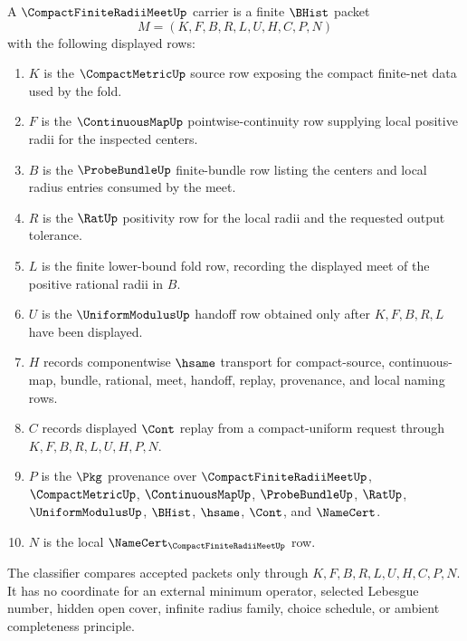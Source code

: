 \begin{definition}
\label{def:compact-finite-radii-meet-carrier}
A $\CompactFiniteRadiiMeetUp$ carrier is a finite $\BHist$ packet
$$
M=(K,F,B,R,L,U,H,C,P,N)
$$
with the following displayed rows:
\begin{enumerate}
\item $K$ is the $\CompactMetricUp$ source row exposing the compact finite-net data used by the fold.
\item $F$ is the $\ContinuousMapUp$ pointwise-continuity row supplying local positive radii for the inspected centers.
\item $B$ is the $\ProbeBundleUp$ finite-bundle row listing the centers and local radius entries consumed by the meet.
\item $R$ is the $\RatUp$ positivity row for the local radii and the requested output tolerance.
\item $L$ is the finite lower-bound fold row, recording the displayed meet of the positive rational radii in $B$.
\item $U$ is the $\UniformModulusUp$ handoff row obtained only after $K,F,B,R,L$ have been displayed.
\item $H$ records componentwise $\hsame$ transport for compact-source, continuous-map, bundle, rational, meet, handoff, replay, provenance, and local naming rows.
\item $C$ records displayed $\Cont$ replay from a compact-uniform request through $K,F,B,R,L,U,H,P,N$.
\item $P$ is the $\Pkg$ provenance over $\CompactFiniteRadiiMeetUp$, $\CompactMetricUp$, $\ContinuousMapUp$, $\ProbeBundleUp$, $\RatUp$, $\UniformModulusUp$, $\BHist$, $\hsame$, $\Cont$, and $\NameCert$.
\item $N$ is the local $\NameCert_{\CompactFiniteRadiiMeetUp}$ row.
\end{enumerate}
The classifier compares accepted packets only through $K,F,B,R,L,U,H,C,P,N$. It has no coordinate for an external minimum operator, selected Lebesgue number, hidden open cover, infinite radius family, choice schedule, or ambient completeness principle.
\end{definition}

